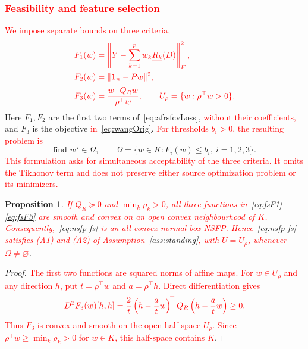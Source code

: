 \documentclass[]{interact}
\theoremstyle{plain}
\newtheorem{proposition}[theorem]{Proposition}
\theoremstyle{definition}
\theoremstyle{remark}
\begin{document}
\subsubsection{\textcolor{red}{Feasibility and feature selection}}\label{ssec:reduction}\label{ssec:selection}
\leavevmode\textcolor{red}{We impose separate bounds on three criteria,}
\begin{align}\color{red}
F_1(w)&\color{red}=\left\|Y-\sum_{k=1}^{p}w_k\underline{R_k}(D)\right\|_F^2,\label{eq:fsF1}\\\color{red}
F_2(w)&\color{red}=\|\mathbf1_n-Pw\|^2,\label{eq:fsF2}\\\color{red}
F_3(w)&\color{red}=\frac{w^{\top}Q_Rw}{\rho^{\top}w},\qquad U_\rho=\{w:\rho^{\top}w>0\}.\label{eq:fsF3}
\end{align}
Here $F_1,F_2$ are the first two terms of~\eqref{eq:afrsfcvLoss}, \leavevmode\textcolor{red}{without their coefficients,} and $F_3$ is the objective \leavevmode\textcolor{red}{in}~\eqref{eq:wangOrig}. \leavevmode\textcolor{red}{For thresholds $b_i>0$, the resulting problem is}
\begin{equation}\label{eq:nsfp-fs}
\text{find }w^\star\in\Omega,\qquad \Omega=\{w\in K:F_i(w)\le b_i,\ i=1,2,3\}.
\end{equation}
\leavevmode\textcolor{red}{This formulation asks for simultaneous acceptability of the three criteria. It omits the Tikhonov term and does not preserve either source optimization problem or its minimizers.}

\begin{proposition}\label{prop:fs-reg}
\leavevmode\textcolor{red}{If $Q_R\succeq0$ and $\min_k\rho_k>0$, all three functions in~\eqref{eq:fsF1}--\eqref{eq:fsF3} are smooth and convex on an open convex neighbourhood of $K$. Consequently,~\eqref{eq:nsfp-fs} is an all-convex normal-box NSFP. Hence~\eqref{eq:nsfp-fs} satisfies (A1) and (A2) of Assumption~\ref{ass:standing}, with $U=U_\rho$, whenever $\Omega\ne\varnothing$}.
\end{proposition}
\begin{proof}
\leavevmode\textcolor{red}{The first two functions are squared norms of affine maps. For $w\in U_\rho$ and any direction $h$, put $t=\rho^{\top}w$ and $a=\rho^{\top}h$. Direct differentiation gives}
\begin{equation}\label{eq:fsF3-curvature}\textcolor{red}{
D^2F_3(w)[h,h]=\frac2t\left(h-\frac atw\right)^{\!\top}Q_R\left(h-\frac atw\right)\ge0.
}\end{equation}
\leavevmode\textcolor{red}{Thus $F_3$ is convex and smooth on the open half-space $U_\rho$. Since $\rho^{\top}w\ge\min_k\rho_k>0$ for $w\in K$, this half-space contains $K$}.
\end{proof}
\end{document}
